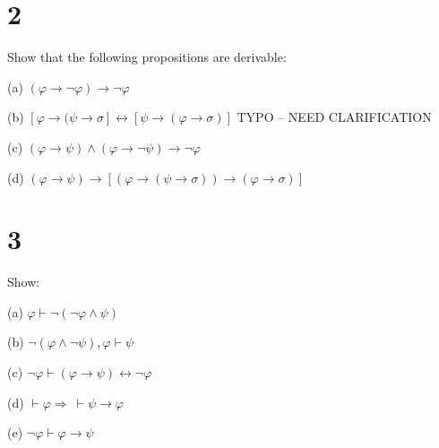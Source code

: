 \documentclass[10pt]{article}
\newcommand{\implies}{\Rightarrow \ }
\begin{document}

\section*{2}
Show that the following propositions are derivable:
\begin{description*}
\item[(a)] $(\varphi \to \lnot \varphi )\to \lnot \varphi $
\item[(b)] $ [ \varphi \to ( \psi \to \sigma ] \leftrightarrow [ \psi \to ( \varphi \to \sigma ) ] $ {\huge TYPO -- NEED CLARIFICATION}
\item[(c)] $( \varphi \to \psi )\land ( \varphi \to \lnot \psi )\to \lnot \varphi$
\item[(d)] $(\varphi \to \psi )\to [ (\varphi \to (\psi \to \sigma )) \to (\varphi \to \sigma ) ]$
\end{description*}


\section*{3}
Show:
\begin{description*}
\item[(a)] $\varphi \vdash \lnot (\lnot \varphi \land \psi )$
\item[(b)] $ \lnot ( \varphi \land \lnot \psi ), \varphi \vdash \psi $
\item[(c)] $\lnot \varphi \vdash (\varphi \to \psi ) \leftrightarrow \lnot \varphi$
\item[(d)] $\vdash \varphi \implies \vdash \psi \to \varphi $
\item[(e)] $\lnot \varphi \vdash \varphi \to \psi $
\end{description*}
\end{document}
